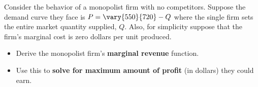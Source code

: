\begin{question}[type=exam]{10}
  Consider the behavior of a monopolist firm with no competitors.
  Suppose the demand curve they face is $P=\vary{550}{720} - Q$ where the single firm sets the entire market quantity supplied, $Q$.
  Also, for simplicity suppose that the firm's marginal cost is zero dollars per unit produced.

  \begin{itemize}
    \item Derive the monopolist firm's \textbf{marginal revenue} function.
    \item Use this to \textbf{solve for maximum amount of profit} (in dollars) they could earn.
  \end{itemize}
\end{question}

